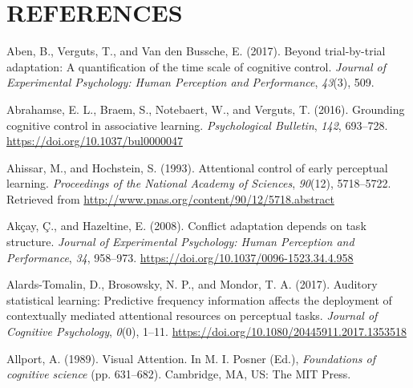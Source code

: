\documentclass[]{DissertateCUNY}
\begin{document}
\FloatBarrier

\newpage

\fancyhead[R]{\thepage}
\fancyfoot[C]{}

\chapter{REFERENCES}

\setlength{\parindent}{-0.5in}
\setlength{\leftskip}{0.5in}
\setlength{\parskip}{6pt}

\noindent

\hypertarget{refs}{}
\leavevmode\hypertarget{ref-aben_beyond_2017}{}%
Aben, B., Verguts, T., and Van den Bussche, E. (2017). Beyond
trial-by-trial adaptation: A quantification of the time scale of
cognitive control. \emph{Journal of Experimental Psychology: Human
Perception and Performance}, \emph{43}(3), 509.

\leavevmode\hypertarget{ref-abrahamse_grounding_2016}{}%
Abrahamse, E. L., Braem, S., Notebaert, W., and Verguts, T. (2016).
Grounding cognitive control in associative learning. \emph{Psychological
Bulletin}, \emph{142}, 693--728.
\url{https://doi.org/10.1037/bul0000047}

\leavevmode\hypertarget{ref-ahissar_attentional_1993}{}%
Ahissar, M., and Hochstein, S. (1993). Attentional control of early
perceptual learning. \emph{Proceedings of the National Academy of
Sciences}, \emph{90}(12), 5718--5722. Retrieved from
\url{http://www.pnas.org/content/90/12/5718.abstract}

\leavevmode\hypertarget{ref-akcay_conflict_2008}{}%
Akçay, Ç., and Hazeltine, E. (2008). Conflict adaptation depends on task
structure. \emph{Journal of Experimental Psychology: Human Perception
and Performance}, \emph{34}, 958--973.
\url{https://doi.org/10.1037/0096-1523.34.4.958}

\leavevmode\hypertarget{ref-alards-tomalin_auditory_2017}{}%
Alards-Tomalin, D., Brosowsky, N. P., and Mondor, T. A. (2017). Auditory
statistical learning: Predictive frequency information affects the
deployment of contextually mediated attentional resources on perceptual
tasks. \emph{Journal of Cognitive Psychology}, \emph{0}(0), 1--11.
\url{https://doi.org/10.1080/20445911.2017.1353518}

\leavevmode\hypertarget{ref-allport_visual_1989}{}%
Allport, A. (1989). Visual Attention. In M. I. Posner (Ed.),
\emph{Foundations of cognitive science} (pp. 631--682). Cambridge, MA,
US: The MIT Press.
\end{document}
